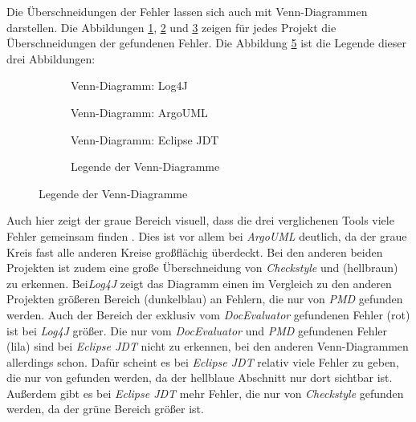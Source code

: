 Die Überschneidungen der Fehler lassen sich auch mit Venn-Diagrammen darstellen.  Die Abbildungen \ref{fig:log4j_venn}, \ref{fig:argo_venn} und  \ref{fig:eclipse_venn} zeigen für jedes Projekt die Überschneidungen der gefundenen Fehler. Die Abbildung \ref{fig:legend_venn} ist die Legende dieser drei Abbildungen:


\begin{figure}[ht!]
\centering
   \begin{subfigure}[b]{0.4\textwidth}
    \centering

    \caption{Venn-Diagramm: Log4J}
    \label{fig:log4j_venn}
\end{subfigure}
\hfill
\begin{subfigure}[b]{0.4\textwidth}
    \centering

    \caption{Venn-Diagramm: ArgoUML}
    \label{fig:argo_venn}
\end{subfigure}
\hspace{10cm}
\begin{subfigure}[b]{0.4\textwidth}
    \centering

    \caption{Venn-Diagramm: Eclipse \ac{JDT}}
    \label{fig:eclipse_venn}
\end{subfigure}
\hspace{3.4cm}
\begin{subfigure}[b]{0.25\textwidth}
    \centering

\vspace{0.3cm}
    \caption{Legende der Venn-Diagramme}
    \label{fig:legend_venn}
\end{subfigure}
\end{figure}

  Auch hier zeigt der graue Bereich visuell, dass die drei verglichenen Tools viele Fehler gemeinsam finden . Dies ist vor allem bei \textit{ArgoUML} deutlich, da der graue Kreis fast alle anderen Kreise großflächig überdeckt. Bei den anderen beiden Projekten ist zudem eine große Überschneidung von \textit{Checkstyle} und \doceval (hellbraun) zu erkennen. Bei\textit{Log4J} zeigt das Diagramm einen im Vergleich zu den anderen Projekten größeren Bereich (dunkelblau) an Fehlern, die nur von \textit{PMD} gefunden werden. Auch der Bereich der exklusiv vom \textit{DocEvaluator} gefundenen Fehler (rot) ist bei \textit{Log4J} größer. Die nur vom \textit{DocEvaluator} und \textit{PMD} gefundenen Fehler (lila) sind bei  \textit{Eclipse \ac{JDT}} nicht zu erkennen, bei den anderen Venn-Diagrammen allerdings schon. Dafür scheint es bei  \textit{Eclipse \ac{JDT}} relativ viele Fehler zu geben, die nur von \checkpmd gefunden werden, da der hellblaue Abschnitt nur dort sichtbar ist. Außerdem gibt es bei  \textit{Eclipse \ac{JDT}} mehr Fehler, die nur von \textit{Checkstyle} gefunden werden, da der grüne Bereich größer ist. 

